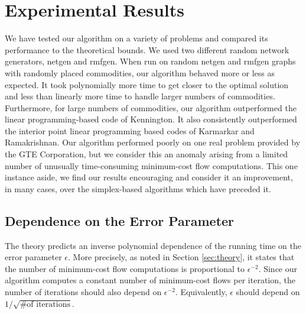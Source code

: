 \section{Experimental Results}
\label{sec:results}
We have tested our algorithm on a variety of problems and compared its
performance to the theoretical bounds.
We used two different random network generators, {\sc netgen} and {\sc
rmfgen}.
When run on random {\sc netgen} and {\sc rmfgen} graphs with   
randomly placed commodities, 
our algorithm behaved more or less as expected.
It took polynomially more time to get closer to the optimal solution
and less than linearly more time to handle larger numbers of commodities.
Furthermore, for large numbers of commodities, 
our algorithm outperformed the linear programming-based code of
Kennington.
It also consistently outperformed the interior point linear
programming based codes of Karmarkar and Ramakrishnan.
Our algorithm performed poorly on one real problem provided by 
the GTE Corporation,
but we consider this an anomaly arising from a limited number of 
unusually time-consuming minimum-cost flow computations.
This one instance aside, we find our results encouraging and consider it 
an improvement, in many cases, over the simplex-based algorithms 
which have preceded it.

\subsection{Dependence on the Error Parameter}
The theory predicts an inverse polynomial dependence of the running
time on the error parameter $\epsilon$.
More precisely, as noted in Section \ref{sec:theory},
it states that the number of minimum-cost flow computations is
proportional to 
$\epsilon^{-2}$.
Since our algorithm computes a constant number of minimum-cost flows per
iteration, the number of iterations should also depend on $\epsilon^{-2}$.
Equivalently, $\epsilon$ should depend on $1/\sqrt{\mbox{\# of iterations}}$.

